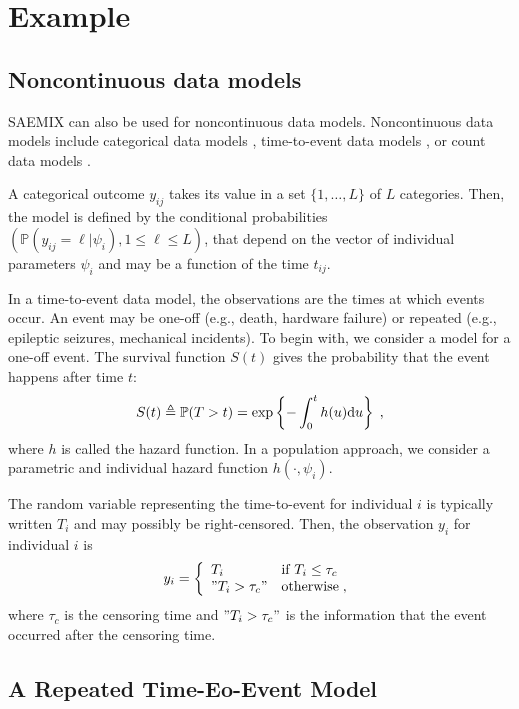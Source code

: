 

\section{Example}
\subsection{Noncontinuous data models}
SAEMIX can also be used for noncontinuous data models. Noncontinuous data models include categorical data models \citep{savic, agresti}, time-to-event data models \citep{mbogning, andersen}, or count data models \citep{savic}.

A categorical outcome $y_{ij}$ takes its value in a set $\{1, \dots, L\}$ of $L$ categories. Then, the model is defined by the conditional probabilities $\left(\mathbb{P}(y_{ij} = \ell | \psi_i),1 \leq \ell \leq L\right)$, that depend on the vector of individual parameters $\psi_i$ and may be a function of the time $t_{ij}$.

In a time-to-event data model, the observations are the times at which events occur. An event may be one-off (e.g., death, hardware failure) or repeated (e.g., epileptic seizures, mechanical incidents).
To begin with, we consider a model for a one-off event. The survival function $S(t)$ gives the probability that the event happens after time $t$:
\begin{equation}\label{survival}
S(t)  \triangleq \mathbb{P}(T >t) = \exp\left\{-\int_{0}^{t}h(u)\textrm{d}u\right\}\;,
\end{equation}
where $h$ is called the hazard function. 
In a population approach, we consider a parametric and individual hazard function $h(\cdot,\psi_i)$.

The random variable representing the time-to-event for individual $i$ is typically written $T_i$ and may possibly be right-censored. Then, the observation $y_i$ for individual $i$ is
\begin{equation}
    y_i = \left\{
    \begin{array}{ll}
        T_i & \mbox{if } T_i \leq \tau_c \\
        "T_i > \tau_c" & \mbox{otherwise}\;,
    \end{array}
\right.
\end{equation}
where $\tau_c$ is the censoring time and $"T_i > \tau_c"$ is the information that the event occurred after the censoring time. 


\subsection{A Repeated Time-Eo-Event Model}
